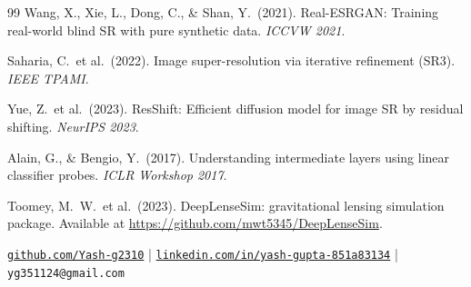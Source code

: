 \documentclass[11pt,a4paper]{article}
\begin{document}
\begin{thebibliography}{99}
Wang, X., Xie, L., Dong, C., \& Shan, Y.\ (2021).
Real-ESRGAN: Training real-world blind SR with pure synthetic data.
\textit{ICCVW 2021}.

Saharia, C.\ et al.\ (2022).
Image super-resolution via iterative refinement (SR3).
\textit{IEEE TPAMI}.

Yue, Z.\ et al.\ (2023).
ResShift: Efficient diffusion model for image SR by residual shifting.
\textit{NeurIPS 2023}.

Alain, G., \& Bengio, Y.\ (2017).
Understanding intermediate layers using linear classifier probes.
\textit{ICLR Workshop 2017}.

Toomey, M.~W.\ et al.\ (2023).
DeepLenseSim: gravitational lensing simulation package.
Available at \url{https://github.com/mwt5345/DeepLenseSim}.
\end{thebibliography}

\vspace{10pt}
\begin{center}
\small\color{darkgray}
\textbullet \href{https://github.com/Yash-g2310}{\texttt{github.com/Yash-g2310}}
\quad|\quad
\textbullet \href{https://www.linkedin.com/in/yash-gupta-851a83134/}{\texttt{linkedin.com/in/yash-gupta-851a83134}}
\quad|\quad
\textbullet \texttt{yg351124@gmail.com}
\end{center}
\end{document}
